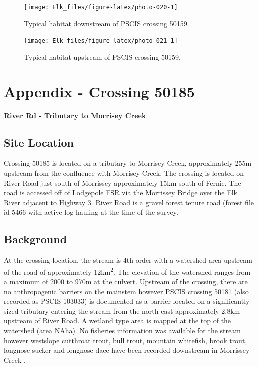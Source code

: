 \documentclass[
]{book}
\begin{document}
\begin{figure}[!ht]
\texttt{[image: Elk\_files/figure-latex/photo-020-1]} \caption{Typical habitat downstream of PSCIS crossing 50159.}\label{fig:photo-020}
\end{figure}

\begin{figure}[!ht]
\texttt{[image: Elk\_files/figure-latex/photo-021-1]} \caption{Typical habitat upstream of PSCIS crossing 50159.}\label{fig:photo-021}
\end{figure}

\hypertarget{appendix---crossing-50185}{%
\chapter*{Appendix - Crossing 50185}\label{appendix---crossing-50185}}

\textbf{River Rd - Tributary to Morrisey Creek}

\hypertarget{site-location-2}{%
\section*{Site Location}\label{site-location-2}}

Crossing 50185 is located on a tributary to Morrisey Creek, approximately 255m upstream from the confluence with Morrisey Creek. The crossing is located on River Road just south of Morrissey approximately 15km south of Fernie. The road is accessed off of Lodgepole FSR via the Morrissey Bridge over the Elk River adjacent to Highway 3. River Road is a gravel forest tenure road (forest file id 5466 with active log hauling at the time of the survey.

\hypertarget{background-3}{%
\section*{Background}\label{background-3}}

At the crossing location, the stream is 4th order with a watershed area upstream of the road of approximately 12km\textsuperscript{2}. The elevation of the watershed ranges from a maximum of 2000 to 970m at the culvert. Upstream of the crossing, there are no anthropogenic barriers on the mainstem however PSCIS crossing 50181 (also recorded as PSCIS 103033) is documented as a barrier located on a significantly sized tributary entering the stream from the north-east approximately 2.8km upstream of River Road. A wetland type area is mapped at the top of the watershed (area NAha). No fisheries information was available for the stream \citep{moeStreamInventorySample} however westslope cutthroat trout, bull trout, mountain whitefish, brook trout, longnose sucker and longnose dace have been recorded downstream in Morrissey Creek \citep{data_fish_obs}.
\end{document}
